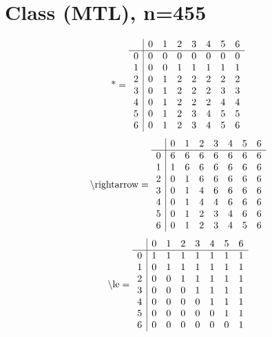 \documentclass[11pt]{article}
\begin{document}
\section{Class (MTL), n=455}
\[\text{*} = 
\begin{array}{r | r r r r r r r}
 & 0 & 1 & 2 & 3 & 4 & 5 & 6 \\ \hline
0 & 0 & 0 & 0 & 0 & 0 & 0 & 0 \\
1 & 0 & 0 & 1 & 1 & 1 & 1 & 1 \\
2 & 0 & 1 & 2 & 2 & 2 & 2 & 2 \\
3 & 0 & 1 & 2 & 2 & 2 & 3 & 3 \\
4 & 0 & 1 & 2 & 2 & 2 & 4 & 4 \\
5 & 0 & 1 & 2 & 3 & 4 & 5 & 5 \\
6 & 0 & 1 & 2 & 3 & 4 & 5 & 6 \\
\end{array}
\]
\[\text{\textbackslash rightarrow} = 
\begin{array}{r | r r r r r r r}
 & 0 & 1 & 2 & 3 & 4 & 5 & 6 \\ \hline
0 & 6 & 6 & 6 & 6 & 6 & 6 & 6 \\
1 & 1 & 6 & 6 & 6 & 6 & 6 & 6 \\
2 & 0 & 1 & 6 & 6 & 6 & 6 & 6 \\
3 & 0 & 1 & 4 & 6 & 6 & 6 & 6 \\
4 & 0 & 1 & 4 & 4 & 6 & 6 & 6 \\
5 & 0 & 1 & 2 & 3 & 4 & 6 & 6 \\
6 & 0 & 1 & 2 & 3 & 4 & 5 & 6 \\
\end{array}
\]
\[\text{\textbackslash le} = 
\begin{array}{r | r r r r r r r}
 & 0 & 1 & 2 & 3 & 4 & 5 & 6 \\ \hline
0 & 1 & 1 & 1 & 1 & 1 & 1 & 1 \\
1 & 0 & 1 & 1 & 1 & 1 & 1 & 1 \\
2 & 0 & 0 & 1 & 1 & 1 & 1 & 1 \\
3 & 0 & 0 & 0 & 1 & 1 & 1 & 1 \\
4 & 0 & 0 & 0 & 0 & 1 & 1 & 1 \\
5 & 0 & 0 & 0 & 0 & 0 & 1 & 1 \\
6 & 0 & 0 & 0 & 0 & 0 & 0 & 1 \\
\end{array}
\]
\end{document}
